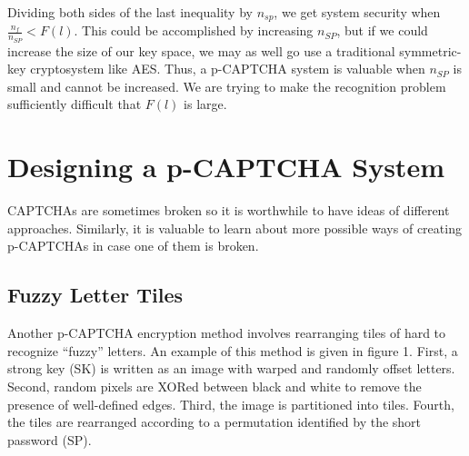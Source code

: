 \documentclass[12pt]{article}
\begin{document}
Dividing both sides of the last inequality by $n_{sp}$, we get system security when $\frac{n_f}{n_{SP}} < F(l)$. This could be accomplished by increasing $n_{SP}$, but if we could increase the size of our key space, we may as well go use a traditional symmetric-key cryptosystem like AES. Thus, a p-CAPTCHA system is valuable when $n_{SP}$ is small and cannot be increased. We are trying to make the recognition problem sufficiently difficult that $F(l)$ is large.

\section*{Designing a p-CAPTCHA System}

CAPTCHAs are sometimes broken so it is worthwhile to have ideas of different approaches. Similarly, it is valuable to learn about more possible ways of creating p-CAPTCHAs in case one of them is broken. 






\subsection*{Fuzzy Letter Tiles}
	Another p-CAPTCHA encryption method involves rearranging tiles of hard to recognize “fuzzy” letters. An example of this method is given in figure 1. First, a strong key (SK) is written as an image with warped and randomly offset letters. Second, random pixels are XORed between black and white to remove the presence of well-defined edges. Third, the image is partitioned into tiles. Fourth, the tiles are rearranged according to a permutation identified by the short password (SP).
\end{document}
